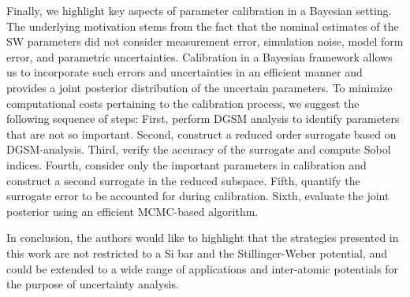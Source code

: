 Finally, we highlight key aspects of parameter calibration in a Bayesian setting.
The underlying motivation stems from the fact that the nominal estimates of the SW
parameters did not consider measurement error, simulation noise, model form error,
and parametric uncertainties. Calibration in a Bayesian framework allows us to
incorporate such errors and uncertainties in an efficient manner and provides
a joint posterior distribution of the uncertain parameters. To minimize computational
costs pertaining to the calibration process, we suggest the following sequence of
steps: First, perform DGSM analysis to 
identify parameters that are not so important. Second, construct a reduced order
surrogate based on DGSM-analysis. Third, verify the accuracy of the surrogate
and compute Sobol indices. Fourth, consider only the important parameters in
calibration and construct a second surrogate in the reduced subspace. Fifth,
quantify the surrogate error to be accounted for during calibration. Sixth,
evaluate the joint posterior using an efficient MCMC-based algorithm.

In conclusion, the authors would like to highlight that the strategies presented 
in this work are not restricted to a Si bar and the Stillinger-Weber potential, and
could be extended to a wide range of applications and inter-atomic potentials for
the purpose of uncertainty analysis. 

